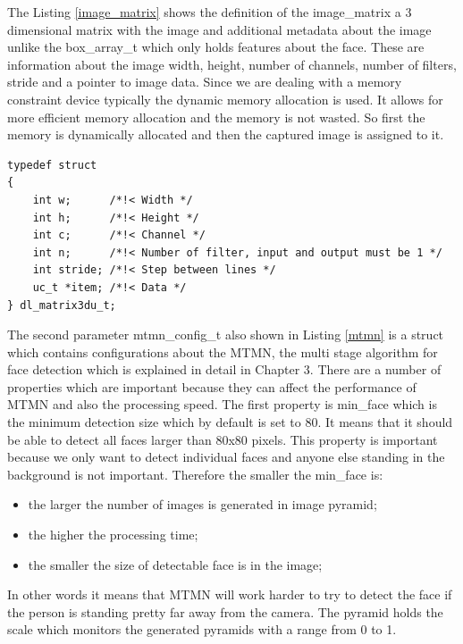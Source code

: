 The Listing \ref{image_matrix} shows the definition of the image\_matrix a 3 dimensional matrix with the image and additional metadata about the image unlike the {\selectfont box\_array\_t} which only holds features about the face. These are information about the image width, height, number of channels, number of filters, stride and a pointer to image data. Since we are dealing with a memory constraint device typically the dynamic memory allocation is used. It allows for more efficient memory allocation and the memory is not wasted. So first the memory is dynamically allocated and then the captured image is assigned to it. 




\begin{lstlisting}[caption={Image matrix structure.},label=image_matrix, captionpos=b]
typedef struct
{
    int w;      /*!< Width */
    int h;      /*!< Height */
    int c;      /*!< Channel */
    int n;      /*!< Number of filter, input and output must be 1 */
    int stride; /*!< Step between lines */
    uc_t *item; /*!< Data */
} dl_matrix3du_t;

\end{lstlisting}


The second parameter {\selectfont mtmn\_config\_t} also shown in Listing \ref{mtmn} is a struct which contains configurations about the MTMN, the multi stage algorithm for face detection which is explained in detail in Chapter 3. There are a number of properties which are important because they can affect the performance of MTMN and also the processing speed. The first property is 
{\selectfont min\_face} which is the minimum detection size which by default is set to 80. It means that it should be able to detect all faces larger than 80x80 pixels. This property is important because we only want to detect individual faces and anyone else standing in the background is not important. Therefore the smaller the {\selectfont min\_face} is: 

\begin{itemize}
    \item the larger the number of images is generated in image pyramid;
    \item the higher the processing time;
     \item the smaller the size of detectable face is in the image;
\end{itemize}


In other words it means that MTMN will work harder to try to detect the face if the person is standing pretty far away from the camera. 
The {\selectfont pyramid} holds the scale which monitors the generated pyramids with a range from 0 to 1. 

